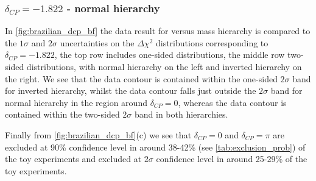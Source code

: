 \subsubsection{$\delta_{CP} = -1.822$ - normal hierarchy}
\color{red}
In \cref{fig:brazilian_dcp_bf} the \RunPeriod data result for \deltacp versus mass hierarchy is compared to the $1\sigma$ and $2\sigma$ uncertainties on the $\Delta\chi^2$ distributions corresponding to $\delta_{CP} = -1.822$, the top row includes one-sided distributions, the middle row two-sided distributions, with normal hierarchy on the left and inverted hierarchy on the right. We see that the data contour is contained within the one-sided $2\sigma$ band for inverted hierarchy, whilst the data contour falls just outside the $2\sigma$ band for normal hierarchy in the region around $\delta_{CP} = 0$, whereas the data contour is contained within the two-sided $2\sigma$ band in both hierarchies.

Finally from \cref{fig:brazilian_dcp_bf}(c) we see that $\delta_{CP} = 0$ and $\delta_{CP} = \pi$ are excluded at 90\% confidence level in around 38-42\% (see \cref{tab:exclusion_prob}) of the toy experiments and excluded at $2\sigma$ confidence level in around 25-29\% of the toy experiments.

